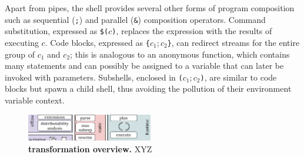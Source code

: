 \documentclass[sigplan,10pt,review,anonymous]{acmart}
\newcommand{\ttt}[1]{\texttt{\small #1}}
\begin{document}
Apart from pipes, the \unix shell provides several other forms of program composition such as sequential (\ttt{;}) and parallel (\ttt{\&}) composition operators.
Command substitution, expressed as \ttt{\$($c$)}, replaces the expression with the results of executing $c$.
Code blocks, expressed as \ttt{\{$c_1; c_2$\}}, can redirect streams for the entire group of $c_1$ and $c_2$;
  this is analogous to an anonymous function, which contains many statements and can possibly be assigned to a variable that can later be invoked with parameters.
Subshells, enclosed in \ttt{($c_1; c_2$)}, are similar to code blocks but spawn a child shell, thus avoiding the pollution of their environment variable context. %




\begin{figure}[t]
\centering
\includegraphics[width=0.49\textwidth]{./figs/dish_overview.pdf}
\caption{
  \textbf{\sys transformation overview.}
	\sys XYZ
}
\label{fig:overview}
\end{figure}
\end{document}

